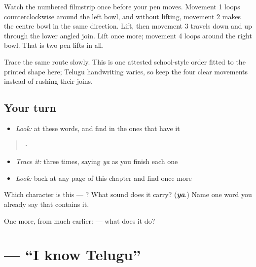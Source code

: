 Watch the numbered filmstrip once before your pen moves. Movement 1 loops counterclockwise around the left bowl, and without lifting, movement 2 makes the centre bowl in the same direction. Lift, then movement 3 travels down and up through the lower angled join. Lift once more; movement 4 loops around the right bowl. That is two pen lifts in all.

Trace the same route slowly. This is one attested school-style order fitted to the printed shape here; Telugu handwriting varies, so keep the four clear movements instead of rushing their joins.

\subsection*{Your turn}
\begin{itemize}
\raggedright
  \item \emph{Look:} at these words, and find  in the ones that have it
\end{itemize}

\begin{quote}
  ·  
\end{quote}

\begin{itemize}
\raggedright
  \item \emph{Trace it:}  three times, saying \emph{ya} as you finish each one
  \item \emph{Look:} back at any page of this chapter and find  once more
\end{itemize}

\begin{tcolorbox}[breakable,colback=teal!4,colframe=teal!35!black,title={Before you move on}]
Which character is this — ? What sound does it carry? (\emph{\textbf{ya}}.) Name one word you already say that contains it.

One more, from much earlier:  — what does it do?
\end{tcolorbox}
\section[\texorpdfstring{\te{నాకు} \te{తెలుగు} \te{వచ్చు} (nāku telugu vaccu)}{నాకు తెలుగు వచ్చు (nāku telugu vaccu)}]{   — \textquotedblleft{}I know Telugu\textquotedblright{}}

\label{lesson:TE-C06-dative-subject}



